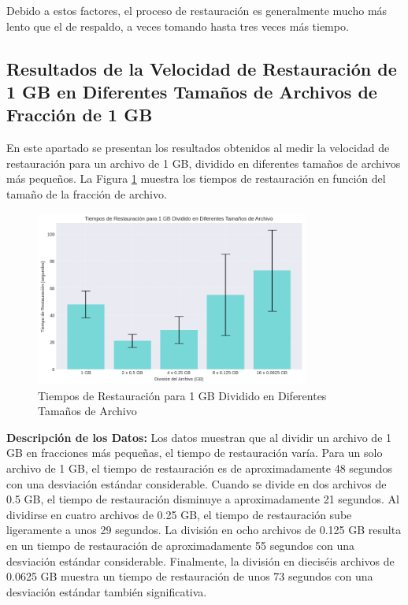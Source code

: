 Debido a estos factores, el proceso de restauración es generalmente mucho más lento que el de respaldo, a veces tomando hasta tres veces más tiempo.


\subsection{Resultados de la Velocidad de Restauración de 1 GB en Diferentes Tamaños de Archivos de Fracción de 1 GB}

En este apartado se presentan los resultados obtenidos al medir la velocidad de restauración para un archivo de 1 GB, dividido en diferentes tamaños de archivos más pequeños. La Figura \ref{fig:tiempo-restauracion-fraccion} muestra los tiempos de restauración en función del tamaño de la fracción de archivo.

\begin{figure}[H]
    \centering
    \includegraphics[width=0.8\textwidth]{tiempo_de_restauracion.png}
    \caption{Tiempos de Restauración para 1 GB Dividido en Diferentes Tamaños de Archivo}
    \label{fig:tiempo-restauracion-fraccion}
\end{figure}

\textbf{Descripción de los Datos:}
Los datos muestran que al dividir un archivo de 1 GB en fracciones más pequeñas, el tiempo de restauración varía. Para un solo archivo de 1 GB, el tiempo de restauración es de aproximadamente 48 segundos con una desviación estándar considerable. Cuando se divide en dos archivos de 0.5 GB, el tiempo de restauración disminuye a aproximadamente 21 segundos. Al dividirse en cuatro archivos de 0.25 GB, el tiempo de restauración sube ligeramente a unos 29 segundos. La división en ocho archivos de 0.125 GB resulta en un tiempo de restauración de aproximadamente 55 segundos con una desviación estándar considerable. Finalmente, la división en dieciséis archivos de 0.0625 GB muestra un tiempo de restauración de unos 73 segundos con una desviación estándar también significativa.

